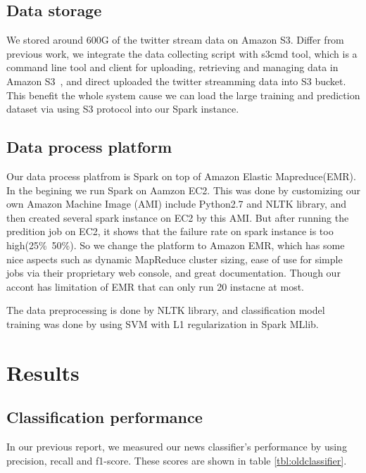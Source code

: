 \documentclass{llncs}
\begin{document}
\subsection{Data storage}
We stored around 600G of the twitter stream data on Amazon S3. Differ from previous work, we integrate the data collecting script with s3cmd tool, which is a command line tool and client for uploading, retrieving and managing data in Amazon S3~\cite{s3cmd}, and direct uploaded the twitter streamming data into S3 bucket. This benefit the whole system cause we can load the large training and prediction dataset via using S3 protocol into our Spark instance. 

\subsection{Data process platform}
Our data process platfrom is Spark on top of Amazon Elastic Mapreduce(EMR). In the begining we run Spark on Aamzon EC2. This was done by customizing our own Amazon Machine Image (AMI) include Python2.7 and NLTK library, and then created several spark instance on EC2 by this AMI. But after running the predition job on EC2, it shows that the failure rate on spark instance is too high(25\%~50\%). So we change the platform to Amazon EMR, which has some nice aspects such as dynamic MapReduce cluster sizing, ease of use for simple jobs via their proprietary web console, and great documentation. Though our accont has limitation of EMR that can only run 20 instacne at most. 

The data preprocessing is done by NLTK library, and classification model training was done by using SVM with L1 regularization in Spark MLlib. 

\section{Results}

\subsection{Classification performance}

In our previous report, we measured our news classifier's performance by using precision, recall and f1-score. These scores are shown in table \ref{tbl:oldclassifier}.
\end{document}

